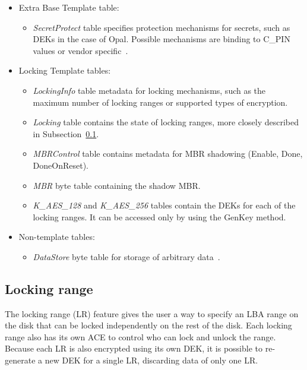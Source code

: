 \begin{itemize}
    \item Extra Base Template table:
    \begin{itemize}
        \item \emph{SecretProtect} table specifies protection mechanisms for secrets, such as DEKs in the case of Opal. Possible mechanisms are binding to C\_PIN values or vendor specific~\cite{tcg-secrets}.
    \end{itemize}
    \item Locking Template tables:
    \begin{itemize}
        \item \emph{LockingInfo} table metadata for locking mechanisms, such as the maximum number of locking ranges or supported types of encryption. 
        \item \emph{Locking} table contains the state of locking ranges, more closely described in Subsection~\ref{locking_range}.
        \item \emph{MBRControl} table contains metadata for MBR shadowing (Enable, Done, DoneOnReset).
        \item \emph{MBR} byte table containing the shadow MBR.
        \item \emph{K\_AES\_128} and \emph{K\_AES\_256} tables contain the DEKs for each of the locking ranges. It can be accessed only by using the GenKey method.
    \end{itemize}
    \item Non-template tables:
    \begin{itemize}
        \item \emph{DataStore} byte table for storage of arbitrary data~\cite{tcg-additional-datastore}.
    \end{itemize}
\end{itemize}

\subsection{Locking range}
\label{locking_range}

The locking range (LR) feature gives the user a way to specify an LBA range on the disk that can be locked independently on the rest of the disk. Each locking range also has its own ACE to control who can lock and unlock the range. Because each LR is also encrypted using its own DEK, it is possible to re-generate a new DEK for a single LR, discarding data of only one LR.


